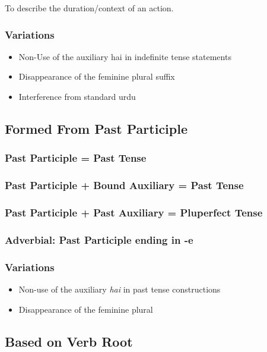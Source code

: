 \documentclass[a4paper]{article}
\begin{document}
To describe the duration/context of an action.

\subsubsection{Variations}

\begin{itemize}
\item
Non-Use of the auxiliary hai in indefinite tense statements
\item
Disappearance of the feminine plural suffix
\item
Interference from standard urdu
\end{itemize}

\subsection{Formed From Past Participle}

\subsubsection{Past Participle = Past Tense}
\subsubsection{Past Participle + Bound Auxiliary = Past Tense}
\subsubsection{Past Participle + Past Auxiliary = Pluperfect Tense}
\subsubsection{Adverbial: Past Participle ending in -e}

\subsubsection{Variations}

\begin{itemize}
\item
Non-use of the auxiliary \textit{hai} in past tense constructions
\item
Disappearance of the feminine plural
\end{itemize}

\subsection{Based on Verb Root}
\end{document}

